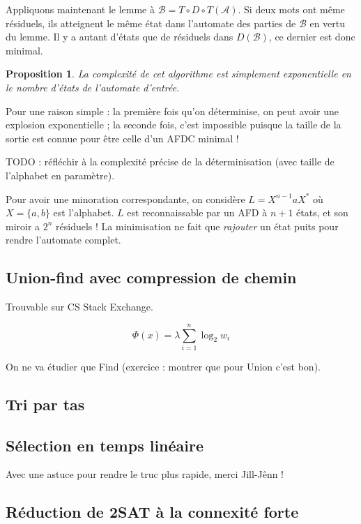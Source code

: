\documentclass[a4paper, 11pt]{article}
\newtheorem*{proposition}{Proposition}
\begin{document}
Appliquons maintenant le lemme à $\mathcal{B} = T \circ D \circ T(\mathcal{A})$.
Si deux mots ont même résiduels, ils atteignent le même état dans l'automate des
parties de $\mathcal{B}$ en vertu du lemme. Il y a autant d'états que de
résiduels dans $D(\mathcal{B})$, ce dernier est donc minimal.

\begin{proposition}
  La complexité de cet algorithme est simplement exponentielle en le nombre
  d'états de l'automate d'entrée.
\end{proposition}

Pour une raison simple : la première fois qu'on déterminise, on peut avoir une
explosion exponentielle ; la seconde fois, c'est impossible puisque la taille de
la sortie est connue pour être celle d'un AFDC minimal !

TODO : réfléchir à la complexité précise de la déterminisation (avec taille de
l'alphabet en paramètre).

Pour avoir une minoration correspondante, on considère $L = X^{n-1}aX^*$ où $X =
\{a,b\}$ est l'alphabet. $L$ est reconnaissable par un AFD à $n+1$ états, et son
miroir a $2^n$ résiduels ! La minimisation ne fait que \emph{rajouter} un état
puits pour rendre l'automate complet.

\subsection{Union-find avec compression de chemin}

Trouvable sur CS Stack Exchange.

\[ \Phi(x) = \lambda \sum_{i=1}^n \log_2 w_i \]

On ne va étudier que Find (exercice : montrer que pour Union c'est bon).

\subsection{Tri par tas}

\subsection{Sélection en temps linéaire}

Avec une astuce pour rendre le truc plus rapide, merci Jill-Jênn !

\subsection{Réduction de 2SAT à la connexité forte}
\end{document}

